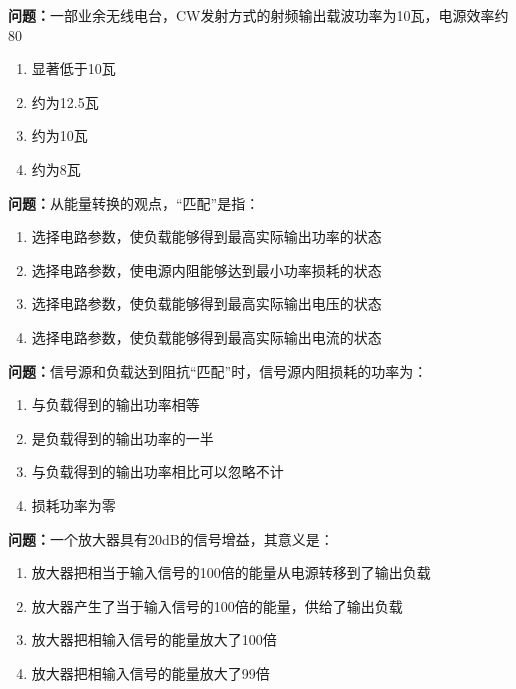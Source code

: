 \bigskip


\noindent\textbf{问题：}一部业余无线电台，CW发射方式的射频输出载波功率为10瓦，电源效率约80%
\begin{enumerate}[label=\Alph*), leftmargin=3em]
\item 显著低于10瓦
\item 约为12.5瓦
\item 约为10瓦
\item 约为8瓦
\end{enumerate}

\bigskip


\noindent\textbf{问题：}从能量转换的观点，“匹配”是指：
\begin{enumerate}[label=\Alph*), leftmargin=3em]
\item 选择电路参数，使负载能够得到最高实际输出功率的状态
\item 选择电路参数，使电源内阻能够达到最小功率损耗的状态
\item 选择电路参数，使负载能够得到最高实际输出电压的状态
\item 选择电路参数，使负载能够得到最高实际输出电流的状态
\end{enumerate}

\bigskip


\noindent\textbf{问题：}信号源和负载达到阻抗“匹配”时，信号源内阻损耗的功率为：
\begin{enumerate}[label=\Alph*), leftmargin=3em]
\item 与负载得到的输出功率相等
\item 是负载得到的输出功率的一半
\item 与负载得到的输出功率相比可以忽略不计
\item 损耗功率为零
\end{enumerate}

\bigskip


\noindent\textbf{问题：}一个放大器具有20dB的信号增益，其意义是：
\begin{enumerate}[label=\Alph*), leftmargin=3em]
\item 放大器把相当于输入信号的100倍的能量从电源转移到了输出负载
\item 放大器产生了当于输入信号的100倍的能量，供给了输出负载
\item 放大器把相输入信号的能量放大了100倍
\item 放大器把相输入信号的能量放大了99倍
\end{enumerate}

\bigskip


